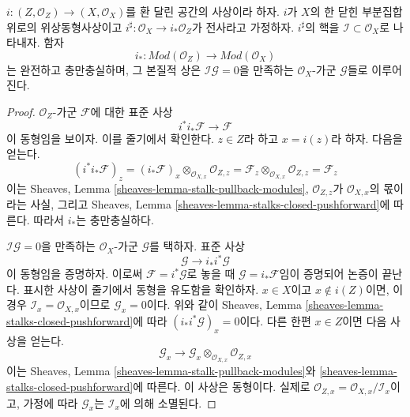 \begin{lemma}
\label{lemma-i-star-equivalence}
$i : (Z, \mathcal{O}_Z) \to (X, \mathcal{O}_X)$를 환 달린 공간의
사상이라 하자. $i$가 $X$의 한 닫힌 부분집합 위로의 위상동형사상이고
$i^\sharp : \mathcal{O}_X \to i_*\mathcal{O}_Z$가 전사라고 가정하자.
$i^\sharp$의 핵을 $\mathcal{I} \subset \mathcal{O}_X$로 나타내자. 함자
$$
i_* :
\textit{Mod}(\mathcal{O}_Z)
\longrightarrow
\textit{Mod}(\mathcal{O}_X)
$$
는 완전하고 충만충실하며, 그 본질적 상은
$\mathcal{I}\mathcal{G} = 0$을 만족하는 $\mathcal{O}_X$-가군
$\mathcal{G}$들로 이루어진다.
\end{lemma}

\begin{proof}
$\mathcal{O}_Z$-가군 $\mathcal{F}$에 대한 표준 사상
$$
i^*i_*\mathcal{F} \longrightarrow \mathcal{F}
$$
이 동형임을 보이자. 이를 줄기에서 확인한다. $z \in Z$라 하고
$x = i(z)$라 하자. 다음을 얻는다.
$$
(i^*i_*\mathcal{F})_z =
(i_*\mathcal{F})_x \otimes_{\mathcal{O}_{X, x}} \mathcal{O}_{Z, z} =
\mathcal{F}_z \otimes_{\mathcal{O}_{X, x}} \mathcal{O}_{Z, z} =
\mathcal{F}_z
$$
이는 Sheaves, Lemma \ref{sheaves-lemma-stalk-pullback-modules},
$\mathcal{O}_{Z, z}$가 $\mathcal{O}_{X, x}$의 몫이라는 사실, 그리고
Sheaves, Lemma \ref{sheaves-lemma-stalks-closed-pushforward}에 따른다.
따라서 $i_*$는 충만충실하다.

\medskip\noindent
$\mathcal{I}\mathcal{G} = 0$을 만족하는 $\mathcal{O}_X$-가군
$\mathcal{G}$를 택하자. 표준 사상
$$
\mathcal{G} \longrightarrow i_*i^*\mathcal{G}
$$
이 동형임을 증명하자. 이로써 $\mathcal{F} = i^*\mathcal{G}$로 놓을 때
$\mathcal{G} = i_*\mathcal{F}$임이 증명되어 논증이 끝난다.
표시한 사상이 줄기에서 동형을 유도함을 확인하자.
$x \in X$이고 $x \not \in i(Z)$이면, 이 경우
$\mathcal{I}_x = \mathcal{O}_{X, x}$이므로 $\mathcal{G}_x = 0$이다.
위와 같이 Sheaves, Lemma \ref{sheaves-lemma-stalks-closed-pushforward}에 따라
$(i_*i^*\mathcal{G})_x = 0$이다. 다른 한편 $x \in Z$이면 다음 사상을 얻는다.
$$
\mathcal{G}_x
\longrightarrow
\mathcal{G}_x \otimes_{\mathcal{O}_{X, x}} \mathcal{O}_{Z, x}
$$
이는 Sheaves, Lemma \ref{sheaves-lemma-stalk-pullback-modules}와
\ref{sheaves-lemma-stalks-closed-pushforward}에 따른다. 이 사상은 동형이다.
실제로 $\mathcal{O}_{Z, x} = \mathcal{O}_{X, x}/\mathcal{I}_x$이고,
가정에 따라 $\mathcal{G}_x$는 $\mathcal{I}_x$에 의해 소멸된다.
\end{proof}

